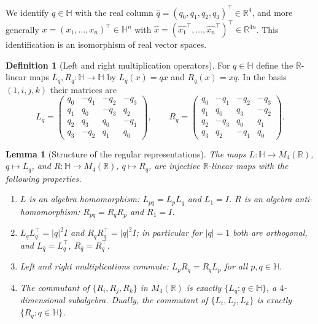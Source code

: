 \documentclass{amsart}
\newtheorem{lemma}[theorem]{Lemma}
\theoremstyle{definition}
\newtheorem{definition}[theorem]{Definition}
\newcommand{\HH}{\mathbb{H}}
\newcommand{\RR}{\mathbb{R}}
\begin{document}
We identify $q\in\HH$ with the real column
$\widehat q=(q_0,q_1,q_2,q_3)^{\!\top}\in\RR^4$, and more generally
$x=(x_1,\dots,x_n)^{\!\top}\in\HH^n$ with
$\widehat x=(\widehat{x_1}^{\!\top},\dots,\widehat{x_n}^{\!\top})^{\!\top}\in\RR^{4n}$.
This identification is an isomorphism of real vector spaces.

\begin{definition}[Left and right multiplication operators]
\label{def:LR}
For $q\in\HH$ define the $\RR$-linear maps
$L_q,R_q\colon\HH\to\HH$ by $L_q(x)=qx$ and $R_q(x)=xq$. In the basis
$(1,i,j,k)$ their matrices are
\[
L_q=
\begin{pmatrix}
q_0&-q_1&-q_2&-q_3\\
q_1& q_0&-q_3& q_2\\
q_2& q_3& q_0&-q_1\\
q_3&-q_2& q_1& q_0
\end{pmatrix},
\qquad
R_q=
\begin{pmatrix}
q_0&-q_1&-q_2&-q_3\\
q_1& q_0& q_3&-q_2\\
q_2&-q_3& q_0& q_1\\
q_3& q_2&-q_1& q_0
\end{pmatrix}.
\]
\end{definition}

\begin{lemma}[Structure of the regular representations]
\label{lem:reg}
The maps $L\colon\HH\to M_4(\RR)$, $q\mapsto L_q$, and
$R\colon\HH\to M_4(\RR)$, $q\mapsto R_q$, are injective $\RR$-linear
maps with the following properties.
\begin{enumerate}
\item[\textup{(i)}] $L$ is an algebra homomorphism: $L_{pq}=L_pL_q$ and
$L_1=I$. $R$ is an algebra anti-homomorphism: $R_{pq}=R_qR_p$ and
$R_1=I$.
\item[\textup{(ii)}] $L_qL_q^{\!\top}=|q|^2 I$ and
$R_qR_q^{\!\top}=|q|^2 I$; in particular for $|q|=1$ both are
orthogonal, and $L_{\bar q}=L_q^{\!\top}$, $R_{\bar q}=R_q^{\!\top}$.
\item[\textup{(iii)}] Left and right multiplications commute:
$L_pR_q=R_qL_p$ for all $p,q\in\HH$.
\item[\textup{(iv)}] The commutant of $\{R_i,R_j,R_k\}$ in $M_4(\RR)$
is exactly $\{L_q:q\in\HH\}$, a $4$-dimensional subalgebra. Dually, the
commutant of $\{L_i,L_j,L_k\}$ is exactly $\{R_q:q\in\HH\}$.
\end{enumerate}
\end{lemma}
\end{document}
